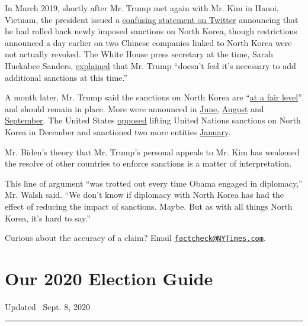 In March 2019, shortly after Mr. Trump met again with Mr. Kim in Hanoi,
Vietnam, the president issued a
\href{https://www.nytimes3xbfgragh.onion/2019/03/22/world/asia/north-korea-sanctions.html}{confusing
statement on Twitter} announcing that he had rolled back newly imposed
sanctions on North Korea, though restrictions announced a day earlier on
two Chinese companies linked to North Korea were not actually revoked.
The White House press secretary at the time, Sarah Huckabee Sanders,
\href{https://www.c-span.org/video/?459128-1/sarah-sanders-reacts-release-mueller-report\&start=392}{explained}
that Mr. Trump ``doesn't feel it's necessary to add additional sanctions
at this time.''

A month later, Mr. Trump said the sanctions on North Korea are
``\href{https://www.cnn.com/2019/04/11/politics/north-korea-white-house-meeting/index.html}{at
a fair level}'' and should remain in place. More were announced in
\href{https://home.treasury.gov/index.php/news/press-releases/sm712}{June},
\href{https://home.treasury.gov/index.php/news/press-releases/sm762}{August}
and
\href{https://home.treasury.gov/news/press-releases/sm774}{September}.
The United States
\href{https://www.reuters.com/article/us-northkorea-usa-un/china-russia-propose-lifting-of-some-u-n-sanctions-on-north-korea-idUSKBN1YK20W}{opposed}
lifting United Nations sanctions on North Korea in December and
sanctioned two more entities
\href{https://home.treasury.gov/news/press-releases/sm874}{January}.

Mr. Biden's theory that Mr. Trump's personal appeals to Mr. Kim has
weakened the resolve of other countries to enforce sanctions is a matter
of interpretation.

This line of argument ``was trotted out every time Obama engaged in
diplomacy,'' Mr. Walsh said. ``We don't know if diplomacy with North
Korea has had the effect of reducing the impact of sanctions. Maybe. But
as with all things North Korea, it's hard to say.''

Curious about the accuracy of a claim? Email
\href{mailto:factcheck@NYTimes.com}{\nolinkurl{factcheck@NYTimes.com}}.

\hypertarget{our-2020-election-guide}{%
\section{Our 2020 Election Guide}\label{our-2020-election-guide}}

Updated ~Sept. 8, 2020

\begin{center}\rule{0.5\linewidth}{\linethickness}\end{center}

